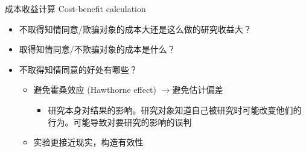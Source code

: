 \documentclass{beamer}
\begin{document}
\begin{frame}{成本收益计算 Cost-benefit calculation}
\begin{itemize}
    \item 不取得知情同意/欺骗对象的成本大还是这么做的研究收益大？
    \item 取得知情同意/不欺骗对象的成本是什么？
    \item 不取得知情同意的好处有哪些？
    \begin{itemize}
        \item 避免霍桑效应 (Hawthorne effect) $\rightarrow$避免估计偏差
        \begin{itemize}
            \item 研究本身对结果的影响。研究对象知道自己被研究时可能改变他们的行为。可能导致对要研究的影响的误判
        \end{itemize}
        \item 实验更接近现实，构造有效性
    \end{itemize}
\end{itemize}
\end{frame}
\end{document}

